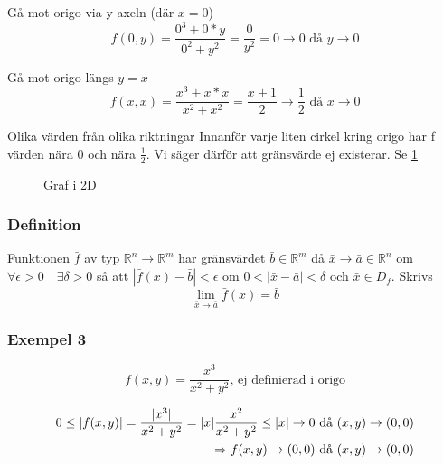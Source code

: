 \documentclass{article}
\DeclarePairedDelimiter \abs{\lvert}{\rvert}
\begin{document}
Gå mot origo via y-axeln (där $x=0$)
\[f(0,y) = \frac{0^3+0*y}{0^2+y^2} = \frac{0}{y^2} =  {0 \rightarrow 0} \text{ då } {y \rightarrow 0}\]

Gå mot origo längs $y=x$
\[f(x,x) = \frac{x^3+x*x}{x^2+x^2} = {\frac{x+1}{2} \rightarrow \frac{1}{2}} \text{ då } {x \rightarrow 0}\]

Olika värden från olika riktningar \newline
Innanför varje liten cirkel kring origo har f värden nära 0 och nära $\frac{1}{2}$.
Vi säger därför att gränsvärde ej existerar. Se \ref{fig:2.1}

\begin{figure}[ht] 
  \caption{Graf i 2D} \label{fig:2.1}
\end{figure}

\newpage
\subsubsection{Definition}

Funktionen \(\bar{f}\) av typ \(\mathbb{R}^n \rightarrow \mathbb{R}^m\) har gränsvärdet \(\bar{b} \in \mathbb{R}^m\) då 
\(\bar{x} \rightarrow \bar{a} \in \mathbb{R}^n\) om \(\forall \epsilon >0 \quad \exists \delta >0\) 
så att \(|\bar{f}(x)-\bar{b}|<\epsilon\) om \(0<|\bar{x}-\bar{a}|<\delta\) och \(\bar{x}\in D_f\). 
Skrivs 
\[
\lim_{\bar{x} \rightarrow \bar{a}} \bar{f}(\bar{x})=\bar{b}
\]

\newpage
\subsubsection{Exempel 3}
\begin{equation} \label{eq:2.3}
	f(x,y)=\frac{x^3}{x^2+y^2} \text{, ej definierad i origo}
\end{equation}

\[
\begin{split}
0 \leq \abs{f(x,y)} = \frac{\abs{x^3}}{x^2+y^2} = \abs{x}\frac{x^2}{x^2+y^2} \leq \abs{x} \rightarrow 0 \text{ då } (x,y) \rightarrow (0,0) \\
\Rightarrow f(x,y) \rightarrow (0,0) \text{ då } (x,y) \rightarrow (0,0)
\end{split}
\]
\end{document}
